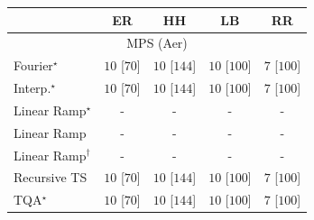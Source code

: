 \begin{tabular}{l|cccc|}
\toprule
            & ER & HH & LB & RR \\
\midrule
\multicolumn{5}{c}{\rule{0pt}{8pt}MPS (Aer)} \\
\midrule
Fourier$^\star$ & {\cellcolor[HTML]{00441B}} \color[HTML]{F1F1F1} $10$ [$70$] & {\cellcolor[HTML]{00441B}} \color[HTML]{F1F1F1} $10$ [$144$] & {\cellcolor[HTML]{00441B}} \color[HTML]{F1F1F1} $10$ [$100$] & {\cellcolor[HTML]{37A055}} \color[HTML]{F1F1F1} $7$ [$100$] \\
Interp.$^\star$ & {\cellcolor[HTML]{00441B}} \color[HTML]{F1F1F1} $10$ [$70$] & {\cellcolor[HTML]{00441B}} \color[HTML]{F1F1F1} $10$ [$144$] & {\cellcolor[HTML]{00441B}} \color[HTML]{F1F1F1} $10$ [$100$] & {\cellcolor[HTML]{37A055}} \color[HTML]{F1F1F1} $7$ [$100$] \\
Linear Ramp$^\star$ & {\cellcolor[HTML]{000000}} \color[HTML]{F1F1F1} {\cellcolor{white}} \color{black} - & {\cellcolor[HTML]{000000}} \color[HTML]{F1F1F1} {\cellcolor{white}} \color{black} - & {\cellcolor[HTML]{000000}} \color[HTML]{F1F1F1} {\cellcolor{white}} \color{black} - & {\cellcolor[HTML]{000000}} \color[HTML]{F1F1F1} {\cellcolor{white}} \color{black} - \\
Linear Ramp & {\cellcolor[HTML]{000000}} \color[HTML]{F1F1F1} {\cellcolor{white}} \color{black} - & {\cellcolor[HTML]{000000}} \color[HTML]{F1F1F1} {\cellcolor{white}} \color{black} - & {\cellcolor[HTML]{000000}} \color[HTML]{F1F1F1} {\cellcolor{white}} \color{black} - & {\cellcolor[HTML]{000000}} \color[HTML]{F1F1F1} {\cellcolor{white}} \color{black} - \\
Linear Ramp$^\dagger$ & {\cellcolor[HTML]{000000}} \color[HTML]{F1F1F1} {\cellcolor{white}} \color{black} - & {\cellcolor[HTML]{000000}} \color[HTML]{F1F1F1} {\cellcolor{white}} \color{black} - & {\cellcolor[HTML]{000000}} \color[HTML]{F1F1F1} {\cellcolor{white}} \color{black} - & {\cellcolor[HTML]{000000}} \color[HTML]{F1F1F1} {\cellcolor{white}} \color{black} - \\
Recursive TS & {\cellcolor[HTML]{00441B}} \color[HTML]{F1F1F1} $10$ [$70$] & {\cellcolor[HTML]{00441B}} \color[HTML]{F1F1F1} $10$ [$144$] & {\cellcolor[HTML]{00441B}} \color[HTML]{F1F1F1} $10$ [$100$] & {\cellcolor[HTML]{37A055}} \color[HTML]{F1F1F1} $7$ [$100$] \\
TQA$^\star$ & {\cellcolor[HTML]{00441B}} \color[HTML]{F1F1F1} $10$ [$70$] & {\cellcolor[HTML]{00441B}} \color[HTML]{F1F1F1} $10$ [$144$] & {\cellcolor[HTML]{00441B}} \color[HTML]{F1F1F1} $10$ [$100$] & {\cellcolor[HTML]{37A055}} \color[HTML]{F1F1F1} $7$ [$100$] \\

\end{tabular}
